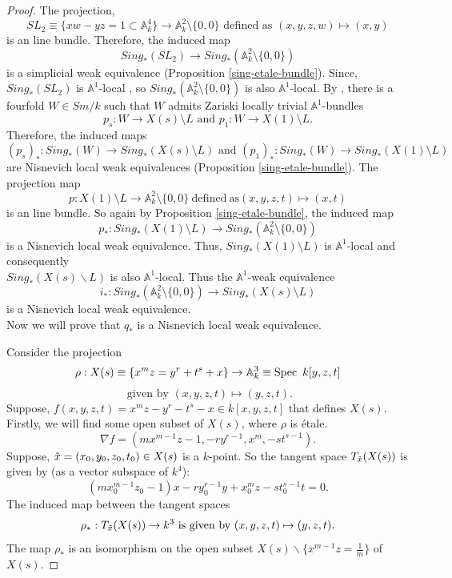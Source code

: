 \documentclass[11pt, reqno]{amsart}
\theoremstyle{plain}
\theoremstyle{definition}
\newcommand{\Spec}{{\rm Spec \,}}
\newcommand{\A}{{\mathbb A}}
\begin{document}
\begin{proof}
The projection, 
$$SL_2 \equiv \{xw-yz=1 \subset \mathbb{A}^4_k\} \to \mathbb{A}^2_k \setminus \{0,0\} \text{ defined as } (x,y,z,w) \mapsto (x,y)$$
is an line bundle. Therefore, the induced map 
$$Sing_*(SL_2) \to Sing_*(\mathbb{A}^2_k \setminus \{0,0\})$$
is a simplicial weak equivalence (Proposition \ref{sing-etale-bundle}). Since, $Sing_*(SL_2)$ is $\mathbb{A}^1$-local \cite[Remark 3.3.8]{asokII}, so $Sing_*(\mathbb{A}^2_k \setminus \{0,0\})$ is also $\mathbb{A}^1$-local. 
By \cite[Proposition 3.1]{df}, there is a fourfold $W \in Sm/k$ such that $W$ admits Zariski locally trivial $\mathbb{A}^1$-bundles 
$$p_s: W \to X(s) \setminus L \text{ and } p_1: W \to X(1)\setminus L.$$
Therefore, the induced maps
$$(p_s)_*: Sing_*(W) \to Sing_*(X(s) \setminus L) \text{ and } (p_1)_*: Sing_*(W) \to Sing_*(X(1) \setminus L)$$
are Nisnevich local weak equivalences (Proposition \ref{sing-etale-bundle}).
 The projection map
$$p: X(1)\setminus L \to \mathbb{A}^2_k \setminus \{0,0\} \mathrm{\ defined\ as } (x,y,z,t) \mapsto (x,t) $$
is an line bundle. So again by Proposition \ref{sing-etale-bundle}, the induced map
$$p_*: Sing_*(X(1) \setminus L) \to Sing_*(\mathbb{A}^2_k \setminus \{0,0\})$$ 
is a Nisnevich local weak equivalence. Thus, $Sing_*(X(1) \setminus L)$ is $\A^1$-local and consequently \\
$Sing_*(X(s)\backslash L)$ is also $\mathbb{A}^1$-local. Thus the $\A^1$-weak equivalence $$i_*: Sing_*(\mathbb{A}^2_k \setminus \{0,0\}) \to Sing_*(X(s) \setminus L)$$ is a Nisnevich local weak equivalence.\\
Now we will prove that $q_*$ is a Nisnevich local weak equivalence.


Consider the projection
$$\rho: X(s) \equiv \{x^mz = y^r+t^s+x\} \to \mathbb{A}^3_k \equiv \Spec\ k[y,z,t]$$
$$ \text{ given by } (x,y,z,t) \mapsto (y,z,t).$$
Suppose, $f(x,y,z,t) = x^mz - y^r-t^s-x \in k[x,y,z,t]$ that defines $X(s)$. Firstly, we will find some open subset of $X(s)$, where $\rho$ is \'etale.
$$\nabla f = (mx^{m-1}z-1, -ry^{r-1}, x^m, -st^{s-1}).$$
Suppose, $\Tilde{x} = (x_0,y_0,z_0,t_0) \in X(s)$ is a $k$-point. So the tangent space $T_{\Tilde{x}}(X(s))$ is given by (as a vector subspace of $k^4$):
$$(mx_0^{m-1}z_0-1)x -ry_0^{r-1}y+ x_0^mz -st_0^{s-1}t = 0.$$
The induced map between the tangent spaces
$$\rho_*: T_{\Tilde{x}}(X(s)) \to k^3 \text{ is given by } (x, y,z,t) \mapsto (y,z,t).$$
The map $\rho_*$ is an isomorphism on the open subset $X(s) \backslash \{x^{m-1}z = \frac{1}{m}\}$ of $X(s)$. 


\end{proof}
\end{document}
